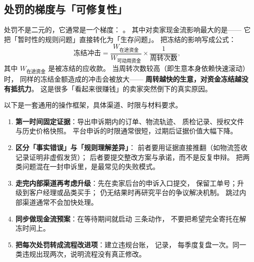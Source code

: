 \subsection{处罚的梯度与「可修复性」}

处罚不是二元的，它通常是一个梯度：
。
其中对卖家现金流影响最大的是——
它把「暂时性的规则问题」直接转化为「生存问题」。
把冻结的影响写成公式：
\begin{equation}
\text{冻结冲击}
= \frac{W_{\text{在途资金}}}{W_{\text{可动用资金}}} \times \frac{1}{\text{周转次数}} ,
\label{eq:plat-freeze}
\end{equation}
其中 $W_{\text{在途资金}}$ 是被冻结的应收款。
当周转次数较高（即生意本身依赖快速滚动）时，
同样的冻结金额造成的冲击会被放大——
\textbf{周转越快的生意，对资金冻结越没有抵抗力}。
这是很多「看起来很赚钱」的卖家突然倒下的真实原因。

\begin{toolbox}[申诉与资金解冻的实操路径]
以下是一套通用的操作框架，具体渠道、时限与材料要求。
\begin{enumerate}
  \item \textbf{第一时间固定证据}：导出申诉期内的订单、物流轨迹、
        质检记录、授权文件与历史价格快照。
        平台申诉的时限通常很短，过期后证据价值大幅下降。
  \item \textbf{区分「事实错误」与「规则理解差异」}：
        前者要用证据直接推翻（如物流签收记录证明非虚假发货）；
        后者要提交整改方案与承诺，而不是反复申辩。
        把两类问题混在一封申诉里，是最常见的失败模式。
  \item \textbf{走完内部渠道再考虑升级}：先在卖家后台的申诉入口提交，
        保留工单号；升级到客户经理或品类买手；
        仍无结果时再研究平台的争议解决机制。
        跳过内部渠道通常不会加快处理。
  \item \textbf{同步做现金流预案}：在等待期间就启动
        三条动作，
        不要把希望完全寄托在解冻时间上。
  \item \textbf{把每次处罚转成流程改进项}：建立违规台账，
        记录，
        每季度复盘一次。同一类违规出现两次，说明流程没有真正修改。
\end{enumerate}
\end{toolbox}

